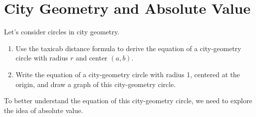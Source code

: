 \newpage

\section{City Geometry and Absolute Value}

\begin{prob}
Let's consider circles in city geometry.  
\begin{enumerate}
\item Use the taxicab distance formula to derive the equation of a city-geometry circle with radius $r$ and center $(a, b)$.  
\item Write the equation of a city-geometry circle with radius 1, centered at the origin, and draw a graph of this city-geometry circle.  
\end{enumerate}
\end{prob}

To better understand the equation of this city-geometry circle, we need to explore the idea of absolute value.  



